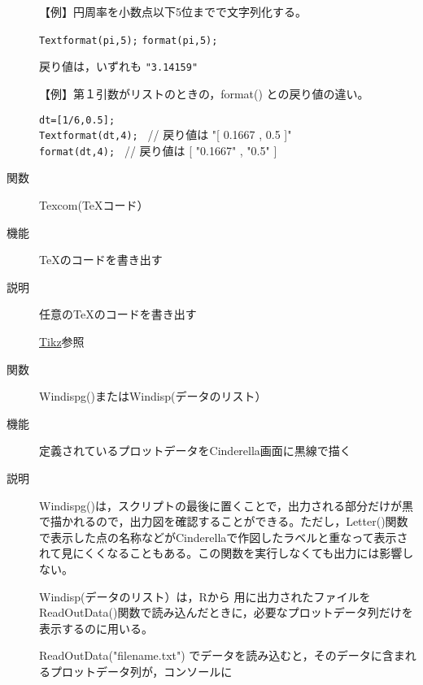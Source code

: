 \documentclass[papersize,a4paper,10pt,uplatex]{jsarticle}
\begin{document}
\begin{description}
\vspace{\baselineskip}
【例】円周率を小数点以下5位までで文字列化する。

\hspace{10mm} \verb|Textformat(pi,5);|
\hspace{10mm} \verb|format(pi,5);|

戻り値は，いずれも \verb|"3.14159"|

\vspace{\baselineskip}
【例】第１引数がリストのときの，format() との戻り値の違い。

\hspace{10mm} \verb|dt=[1/6,0.5];|\\
\hspace{10mm} \verb|Textformat(dt,4); | // 戻り値は "[ 0.1667 , 0.5 ]" \\
\hspace{10mm} \verb|format(dt,4); | // 戻り値は [ "0.1667" , "0.5" ] \\


\vspace{\baselineskip}
\hypertarget{texcom}{}
\item[関数]Texcom(\TeX コード）
\item[機能]\TeX のコードを書き出す
\item[説明]任意の\TeX のコードを書き出す

\hspace*{10mm}\hyperlink{tikztexcom}{Tikz}参照

\vspace{\baselineskip}
\hypertarget{windispg}{}
\item[関数]Windispg()またはWindisp(データのリスト）
\item[機能]定義されているプロットデータをCinderella画面に黒線で描く
\item[説明]Windispg()は，スクリプトの最後に置くことで，出力される部分だけが黒で描かれるので，出力図を確認することができる。ただし，Letter()関数で表示した点の名称などがCinderellaで作図したラベルと重なって表示されて見にくくなることもある。この関数を実行しなくても出力には影響しない。

Windisp(データのリスト）は，Rから \ketcindy 用に出力されたファイルを ReadOutData()関数で読み込んだときに，必要なプロットデータ列だけを表示するのに用いる。

ReadOutData("filename.txt") でデータを読み込むと，そのデータに含まれるプロットデータ列が，コンソールに


\end{description}
\end{document}
